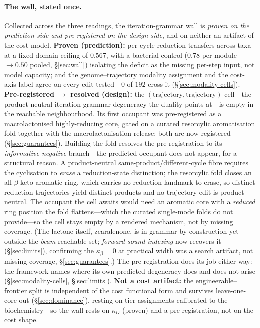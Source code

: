 \documentclass[11pt]{article}
\theoremstyle{definition}
\begin{document}
\paragraph{The wall, stated once.} Collected across the three readings, the iteration-grammar wall is
\emph{proven on the prediction side and pre-registered on the design side}, and on neither an artifact of
the cost model. \textbf{Proven (prediction):} per-cycle reduction transfers across taxa at a fixed-domain
ceiling of $0.567$, with a bacterial control ($0.78$ per-module $\to 0.50$ pooled, \S\ref{sec:wall})
isolating the deficit as the missing per-step input, not model capacity; and the genome--trajectory
modality assignment and the cost-axis label agree on every edit tested---$0$ of $192$ cross it
(\S\ref{sec:modality-cells}). \textbf{Pre-registered $\to$ resolved (design):} the $(\text{trajectory},\text{trajectory})$
cell---the product-neutral iteration-grammar degeneracy the duality points at---is empty in the reachable
neighbourhood. Its first occupant was pre-registered as a macrolactonised highly-reducing core, gated on a
curated resorcylic aromatisation fold together with the macrolactonisation release; both are now registered
(\S\ref{sec:guarantees}). Building the fold resolves the pre-registration to its \emph{informative-negative}
branch---the predicted occupant does not appear, for a structural reason. A product-neutral
same-product/different-cycle fibre requires the cyclisation to \emph{erase} a reduction-state distinction;
the resorcylic fold closes an all-$\beta$-keto aromatic ring, which carries no reduction landmark to erase,
so distinct reduction trajectories yield distinct products and no trajectory edit is product-neutral. The
occupant the cell awaits would need an aromatic core with a \emph{reduced} ring position the fold
flattens---which the curated single-mode folds do not provide---so the cell stays empty by a rendered
mechanism, not by missing coverage. (The lactone itself, zearalenone, is in-grammar by construction yet
outside the \emph{beam}-reachable set; \emph{forward sound indexing} now recovers it (\S\ref{sec:limits}),
confirming the $\kappa_\beta{=}0$ at practical width was a search artifact, not missing coverage,
\S\ref{sec:guarantees}.)
The pre-registration does its job either way: the framework names where its own predicted degeneracy does
and does not arise (\S\ref{sec:modality-cells}, \S\ref{sec:limits}). \textbf{Not a cost artifact:} the engineerable--frontier split is independent of the
cost functional form and survives leave-one-core-out (\S\ref{sec:dominance}), resting on tier assignments
calibrated to the biochemistry---so the wall rests on $\kappa_O$ (proven) and a pre-registration, not on the
cost shape.
\end{document}
